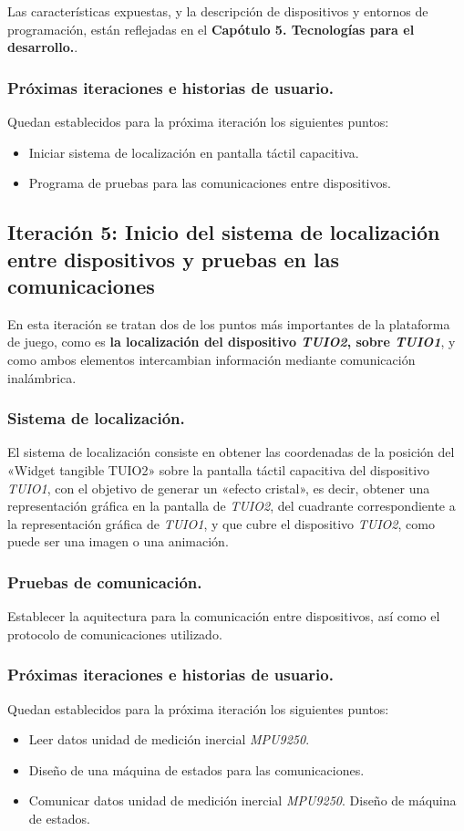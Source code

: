 Las características expuestas, y la descripción de dispositivos y entornos de programación, están reflejadas en el \textbf{Capótulo 5. Tecnologías para el desarrollo.}.

\subsubsection{Próximas iteraciones e historias de usuario.}
Quedan establecidos para la próxima iteración los siguientes puntos:
\begin{itemize}
\item Iniciar sistema de localización en pantalla táctil capacitiva.
\item Programa de pruebas para las comunicaciones entre dispositivos. 
\end{itemize}

\subsection{Iteración 5: Inicio del sistema de localización entre dispositivos y pruebas en las comunicaciones }

En esta iteración se tratan dos de los puntos más importantes de la plataforma de juego, como es \textbf{la localización del dispositivo \emph{TUIO2}, sobre \emph{TUIO1}}, y como ambos elementos intercambian información mediante comunicación inalámbrica.

\subsubsection{Sistema de localización.}

El sistema de localización consiste en obtener las coordenadas de la posición del «Widget tangible TUIO2» sobre la pantalla táctil capacitiva del dispositivo \emph{TUIO1}, con el objetivo de generar un «efecto cristal», es decir, obtener una representación gráfica en la pantalla de \emph{TUIO2}, del cuadrante correspondiente a la representación gráfica de \emph{TUIO1}, y que cubre el dispositivo \emph{TUIO2}, como puede ser una imagen o una animación.\

\subsubsection{Pruebas de comunicación.}
Establecer la aquitectura para la comunicación entre dispositivos, así como el protocolo de comunicaciones utilizado.

\subsubsection{Próximas iteraciones e historias de usuario.}
Quedan establecidos para la próxima iteración los siguientes puntos:
\begin{itemize}
\item Leer datos unidad de medición inercial \emph{MPU9250}.
\item Diseño de una máquina de estados para las comunicaciones.
\item Comunicar datos unidad de medición inercial \emph{MPU9250}. Diseño de máquina de estados.
\end{itemize}

